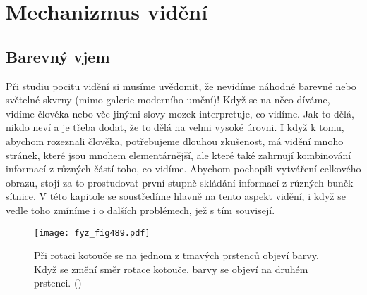 \setchaptertoc
\chapter{Mechanizmus vidění}\label{fyz:IchapXXXVI}
  \section{Barevný vjem}\label{fyz:IchapXXXVIsecI}
    Při studiu pocitu vidění si musíme uvědomit, že nevidíme náhodné barevné nebo světelné skvrny
    (mimo galerie moderního umění)! Když se na něco díváme, vidíme člověka nebo věc jinými slovy
    mozek interpretuje, co vidíme. Jak to dělá, nikdo neví a je třeba dodat, že to dělá na velmi
    vysoké úrovni. I když k tomu, abychom rozeznali člověka, potřebujeme dlouhou zkušenost, má
    vidění mnoho stránek, které jsou mnohem elementárnější, ale které také zahrnují kombinování
    informací z různých částí toho, co vidíme. Abychom pochopili vytváření celkového obrazu, stojí
    za to prostudovat první stupně skládání informací z různých buněk sítnice. V této kapitole se
    soustředíme hlavně na tento aspekt vidění, i když se vedle toho zmíníme i o dalších problémech,
    jež s tím souvisejí.

    \begin{figure}[ht!] %
      \centering
      \texttt{[image: fyz\_fig489.pdf]}
      \caption{Při rotaci kotouče se na jednom z tmavých prstenců objeví barvy. Když se změní směr
        rotace kotouče, barvy se objeví na druhém prstenci. (\cite[s.~697]{Feynman01})}
      \label{fyz:fig489}
    \end{figure}

